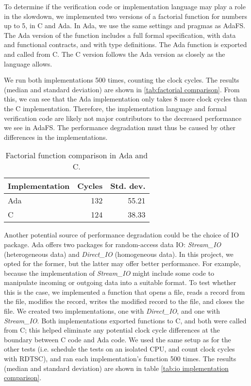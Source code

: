 To determine if the verification code or implementation language may play a role in the slowdown, we implemented two versions of a factorial function for numbers up to 5, in C and Ada.
In Ada, we use the same settings and pragmas as AdaFS.
The Ada version of the function includes a full formal specification, with data and functional contracts, and with type definitions.
The Ada function is exported and called from C.
The C version follows the Ada version as closely as the language allows.

We run both implementations 500 times, counting the clock cycles.
The results (median and standard deviation) are shown in \autoref{tab:factorial comparison}.
From this, we can see that the Ada implementation only takes 8 more clock cycles than the C implementation.
Therefore, the implementation language and formal verification code are likely not major contributors to the decreased performance we see in AdaFS.
The performance degradation must thus be caused by other differences in the implementations.

\begin{table}[h]
  \centering
  \begin{tabular}{l | r | r}
    Implementation & Cycles & Std. dev. \\
    \hline \hline
    Ada            & 132    & 55.21     \\
    C              & 124    & 38.33
  \end{tabular}
  \caption{Factorial function comparison in Ada and C.}
  \label{tab:factorial comparison}
\end{table}

Another potential source of performance degradation could be the choice of IO package.
Ada offers two packages for random-access data IO: \textit{Stream\_IO} (heterogeneous data) and \textit{Direct\_IO} (homogeneous data).
In this project, we opted for the former, but the latter may offer better performance.
For example, because the implementation of \textit{Stream\_IO} might include some code to manipulate incoming or outgoing data into a suitable format.
To test whether this is the case, we implemented a function that opens a file, reads a record from the file, modifies the record, writes the modified record to the file, and closes the file.
We created two implementations, one with \textit{Direct\_IO}, and one with \textit{Stream\_IO}.
Both implementations exported functions to C, and both were called from C; this helped eliminate any potential clock cycle differences at the boundary between C code and Ada code.
We used the same setup as for the other tests (i.e. schedule the tests on an isolated CPU, and count clock cycles with RDTSC), and ran each implementation's function 500 times.
The results (median and standard deviation) are shown in table \autoref{tab:io implementation comparison}.


